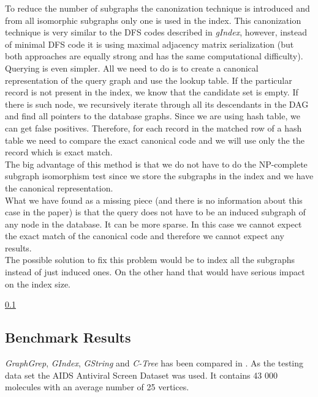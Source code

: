 To reduce the number of subgraphs the canonization technique is introduced and from all isomorphic subgraphs only one is used in the index. This canonization technique is very similar to the DFS codes described in \textit{gIndex}, however, instead of minimal DFS code it is using maximal adjacency matrix serialization (but both approaches are equally strong and has the same computational difficulty).\\

Querying is even simpler. All we need to do is to create a canonical representation of the query graph and use the lookup table. If the particular record is not present in the index, we know that the candidate set is empty. If there is such node, we recursively iterate through all its descendants in the DAG and find all pointers to the database graphs. Since we are using hash table, we can get false positives. Therefore, for each record in the matched row of a hash table we need to compare the exact canonical code and we will use only the the record which is exact match.\\

The big advantage of this method is that we do not have to do the NP-complete subgraph isomorphism test since we store the subgraphs in the index and we have the canonical representation.\\

What we have found as a missing piece (and there is no information about this case in the paper) is that the query does not have to be an induced subgraph of any node in the database. It can be more sparse. In this case we cannot expect the exact match of the canonical code and therefore we cannot expect any results.\\

The possible solution to fix this problem would be to index all the subgraphs instead of just induced ones. On the other hand that would have serious impact on the index size.

\ref{}\subsection{Benchmark Results}

\textit{GraphGrep}, \textit{GIndex}, \textit{GString} and \textit{C-Tree} has been compared in \cite{GString}. As the testing data set the AIDS Antiviral Screen Dataset \cite{AIDS} was used. It contains 43 000 molecules with an average number of 25 vertices.\\

